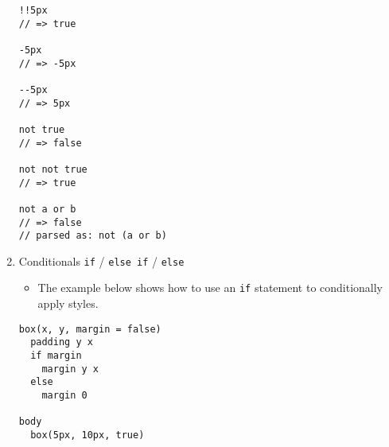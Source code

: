 \documentclass[10pt, twocolumn]{article}
\begin{document}
\begin{enumerate}
\begin{lstlisting}[frame=single]
!!5px
// => true

-5px
// => -5px

--5px
// => 5px

not true
// => false

not not true
// => true

not a or b
// => false
// parsed as: not (a or b)
\end{lstlisting}

\item Conditionals \texttt{if} / \texttt{else if} / \texttt{else}
\begin{itemize}
\item The example below shows how to use an \texttt{if} statement to conditionally apply styles.
\end{itemize}
\begin{lstlisting}[frame=single]
box(x, y, margin = false)
  padding y x
  if margin
    margin y x
  else
    margin 0

body
  box(5px, 10px, true)
\end{lstlisting}

\end{enumerate}
\end{document}
